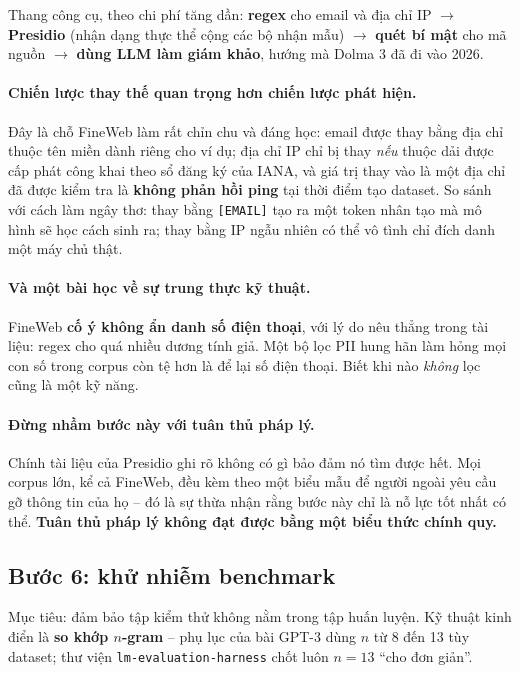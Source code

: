 Thang công cụ, theo chi phí tăng dần: \textbf{regex} cho email và địa chỉ IP $\rightarrow$ \textbf{Presidio} (nhận dạng thực thể cộng các bộ nhận mẫu) $\rightarrow$ \textbf{quét bí mật} cho mã nguồn $\rightarrow$ \textbf{dùng LLM làm giám khảo}, hướng mà Dolma 3 đã đi vào 2026.

\paragraph{Chiến lược thay thế quan trọng hơn chiến lược phát hiện.} Đây là chỗ FineWeb làm rất chỉn chu và đáng học: email được thay bằng địa chỉ thuộc tên miền dành riêng cho ví dụ; địa chỉ IP chỉ bị thay \emph{nếu} thuộc dải được cấp phát công khai theo sổ đăng ký của IANA, và giá trị thay vào là một địa chỉ đã được kiểm tra là \textbf{không phản hồi ping} tại thời điểm tạo dataset. So sánh với cách làm ngây thơ: thay bằng \texttt{[EMAIL]} tạo ra một token nhân tạo mà mô hình sẽ học cách sinh ra; thay bằng IP ngẫu nhiên có thể vô tình chỉ đích danh một máy chủ thật.

\paragraph{Và một bài học về sự trung thực kỹ thuật.} FineWeb \textbf{cố ý không ẩn danh số điện thoại}, với lý do nêu thẳng trong tài liệu: regex cho quá nhiều dương tính giả. Một bộ lọc PII hung hãn làm hỏng mọi con số trong corpus còn tệ hơn là để lại số điện thoại. Biết khi nào \emph{không} lọc cũng là một kỹ năng.

\paragraph{Đừng nhầm bước này với tuân thủ pháp lý.} Chính tài liệu của Presidio ghi rõ không có gì bảo đảm nó tìm được hết. Mọi corpus lớn, kể cả FineWeb, đều kèm theo một biểu mẫu để người ngoài yêu cầu gỡ thông tin của họ -- đó là sự thừa nhận rằng bước này chỉ là nỗ lực tốt nhất có thể. \textbf{Tuân thủ pháp lý không đạt được bằng một biểu thức chính quy.}

\subsection{Bước 6: khử nhiễm benchmark}
\label{ssec:decontamination}

Mục tiêu: đảm bảo tập kiểm thử không nằm trong tập huấn luyện. Kỹ thuật kinh điển là \textbf{so khớp $n$-gram} -- phụ lục của bài GPT-3 dùng $n$ từ 8 đến 13 tùy dataset; thư viện \texttt{lm-\allowbreak evaluation-\allowbreak harness} chốt luôn $n=13$ “cho đơn giản”.

